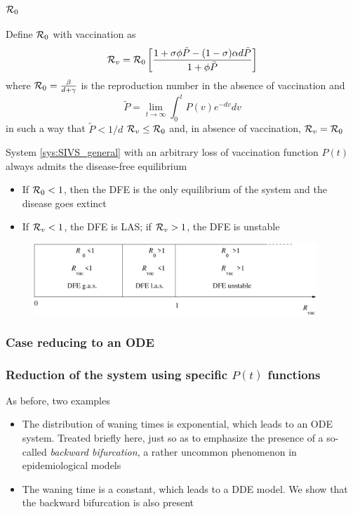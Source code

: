 \documentclass[aspectratio=169]{beamer}\usepackage[]{graphicx}\usepackage[]{xcolor}
\begin{document}
\begin{frame}\frametitle{$\mathcal{R}_0$}
Define $\mathcal{R}_0$ with vaccination as
\begin{equation}
\mathcal{R}_v=\mathcal{R}_0\left[
\frac{1+\sigma\phi\tilde P-(1-\sigma)\alpha d\tilde P}
{1+\phi\tilde P}
\right]
\label{eq:generalRphi}
\end{equation}
where $\mathcal{R}_0=\frac{\beta}{d+\gamma}$ is the reproduction number in the absence of vaccination and 
\[
\tilde P=\lim_{t\to\infty}\int_0^t P(v)e^{-dv}dv
\]
in such a way that $\tilde P<1/d$
\vfill
\bbullet
$\mathcal{R}_v\leq \mathcal{R}_0$ and, in absence of vaccination,
$\mathcal{R}_v=\mathcal{R}_0$
\end{frame}

\begin{frame}
\begin{theorem}
System \eqref{sys:SIVS_general} with an arbitrary loss of vaccination function $P(t)$ always admits the disease-free equilibrium
\begin{itemize}
\item
If $\mathcal{R}_0< 1$, then the DFE is the only equilibrium of the system and the disease goes extinct
\item
If $\mathcal{R}_v<1$, the DFE is LAS; if $\mathcal{R}_v>1$, the DFE is unstable
\end{itemize}
\label{th:R0_gen_mod}
\end{theorem}
\vfill
\begin{figure}[htbp]
 \begin{center}
   \includegraphics[width=0.95\textwidth]{FIGS/Rvac}
 \end{center}
\end{figure}
\end{frame}


\subsubsection{Case reducing to an ODE}

\begin{frame}\frametitle{Reduction of the system using specific $P(t)$ functions}
As before, two examples
\vfill
\begin{itemize}
\item The distribution of waning times is exponential, which leads to
 an ODE system. Treated briefly here, just so as to emphasize the
 presence of a so-called \emph{backward bifurcation}, a rather
 uncommon phenomenon in epidemiological models
\vfill
\item The waning time is a constant, which leads to a DDE model. We
 show that the backward bifurcation is also present
\end{itemize}
\end{frame}
\end{document}
